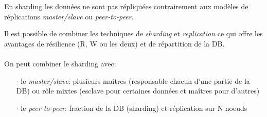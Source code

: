 \item{}
{\faux}
{En sharding les données ne sont pas répliquées contrairement aux modèles de réplications \textit{master/slave} ou \textit{peer-to-peer}.}


\item{}
{\faux}
{Il est possible de combiner les techniques de \textit{sharding} et \textit{replication} ce qui offre les avantages de résilience (R, W ou les deux) et de répartition de la DB.
\paragraph{}
On peut combiner le sharding avec:
\begin{itemize}
\item[$\cdot$]le \textit{master/slave}: plusieurs maîtres (responsable chacun d'une partie de la DB) ou rôle mixtes (esclave pour certaines données et maîtres pour d'autres)
\item[$\cdot$]le \textit{peer-to-peer}: fraction de la DB (sharding) et réplication sur N noeuds
\end{itemize}
}


